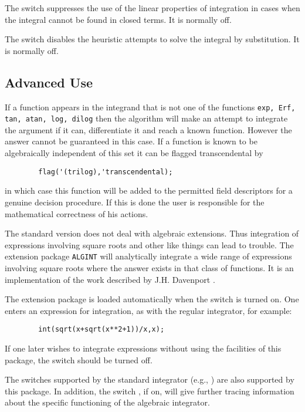 The switch  suppresses the use of the linear properties of
integration in cases when the integral cannot be found in closed terms.
It is normally off.

The switch  disables the heuristic attempts to solve
the integral by substitution. It is normally off.

\subsection{Advanced Use}
\hypertarget{operator:ERF}{}

If a function appears in the integrand that is not one of the functions
\texttt{exp, Erf, tan, atan, log, dilog}
then the algorithm will make an
attempt to integrate the argument if it can, differentiate it and reach a
known function.  However the answer cannot be guaranteed in this case.  If
a function is known to be algebraically independent of this set it can be
flagged transcendental by
\begin{verbatim}
        flag('(trilog),'transcendental);
\end{verbatim}
in which case this function will be added to the permitted field
descriptors for a genuine decision procedure. If this is done the user is
responsible for the mathematical correctness of his actions.


The standard version does not deal with algebraic extensions. Thus
integration of expressions involving square roots and other like things
can lead to trouble.  The extension package \texttt{ALGINT} 
will analytically integrate a wide range of
expressions involving square roots where the answer exists in that class
of functions. It is an implementation of the work described by J.H.
Davenport \cite{Davenport:81}.

\hypertarget{switch:ALGINT}{}
The extension package is loaded automatically when the switch 
is turned on.
One enters an expression for integration, as with the regular integrator,
for example:
\begin{verbatim}
        int(sqrt(x+sqrt(x**2+1))/x,x);
\end{verbatim}
If one later wishes to integrate expressions without using the facilities of
this package, the switch   should be turned
off.

\hypertarget{switch:TRA}{}
The switches supported by the standard integrator (e.g., )
 are also supported by this package.  In addition, the
switch ,  if on, will give further tracing
information about the specific functioning of the algebraic integrator.



